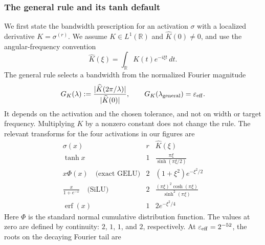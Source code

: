 \providecommand{\BandwidthWidthFigure}{figures/bandwidth_width_rules.pdf}
\providecommand{\BandwidthErrorFigure}{figures/bandwidth_error_rules.pdf}

\subsubsection{The general rule and its tanh default}
\label{app:bw-general-rule}

We first state the bandwidth prescription for an activation $\sigma$ with a
localized derivative $K=\sigma^{(r)}$. We assume $K\in L^1(\mathbb R)$ and
$\widehat K(0)\ne0$, and use the angular-frequency convention
\[
 \widehat K(\xi)=\int_{\mathbb R}K(t)e^{-i\xi t}\,dt.
\]
The general rule selects a bandwidth from the normalized Fourier magnitude
\begin{equation}
 G_K(\lambda):=
 \frac{|\widehat K(2\pi/\lambda)|}{|\widehat K(0)|},
 \qquad
 G_K(\lambda_{\rm general})=\varepsilon_{\rm eff}.
 \label{eq:bw-general-score}
\end{equation}
It depends on the activation and the chosen tolerance, and not on width or
target frequency. Multiplying $K$ by a nonzero constant does not change the
rule. The relevant transforms for the four activations in our figures are
\begin{equation}
\begin{array}{c|c|c}
 \sigma(x)&r&\widehat K(\xi)\\\hline
 \tanh x&1&\displaystyle\frac{\pi\xi}{\sinh(\pi\xi/2)}\\[5pt]
 x\Phi(x)\quad\text{(exact GELU)}&2&
       (1+\xi^2)e^{-\xi^2/2}\\[3pt]
 \displaystyle\frac{x}{1+e^{-x}}\quad\text{(SiLU)}&2&
       \displaystyle\frac{(\pi\xi)^2\cosh(\pi\xi)}{\sinh^2(\pi\xi)}\\[5pt]
 \operatorname{erf}(x)&1&2e^{-\xi^2/4}
\end{array}
\label{eq:bw-three-transforms}
\end{equation}
Here $\Phi$ is the standard normal cumulative distribution function. The
values at zero are defined by continuity: $2$, $1$, $1$, and $2$, respectively.
At $\varepsilon_{\rm eff}=2^{-52}$, the roots on the decaying Fourier tail are
